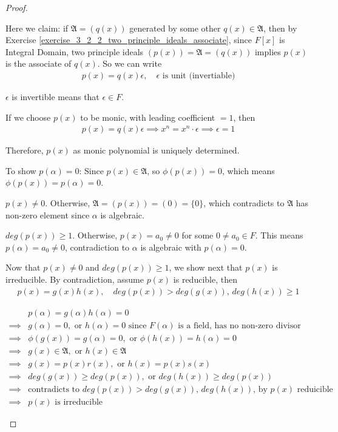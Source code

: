 \documentclass[utf8]{ctexbook}
\begin{document}
\begin{proof}
\begin{enumerate}
{Here we claim: if $\mathfrak{A} = (q(x))$ generated by some other $q(x) \in \mathfrak{A}$, then by Exercise \ref{exercise_3_2_2_two_principle_ideals_associate}, since $F[x]$ is Integral Domain, two principle ideals $(p(x)) = \mathfrak{A} = (q(x))$ implies $p(x)$ is the associate of $q(x)$. So we can write
\begin{align*}
p(x) = q(x) \epsilon, \quad \epsilon \mbox{ is unit (invertiable)}
\end{align*}

$\epsilon$ is invertible means that $\epsilon \in F$. 

If we choose $p(x)$ to be monic, with leading coefficient $=1$, then
\begin{align*}
p(x) = q(x) \epsilon \implies x^n = x^n \cdot \epsilon \implies \epsilon = 1
\end{align*}

Therefore, $p(x)$ as monic polynomial is uniquely determined.

To show $p(\alpha) = 0$: Since $p(x) \in \mathfrak{A}$, so $\phi(p(x)) = 0$, which means $\phi(p(x)) = p(\alpha) = 0$.

$p(x) \neq 0$. Otherwise, $\mathfrak{A}= (p(x)) = (0) = \{ 0\}$, which contradicts to $\mathfrak{A}$ has non-zero element since $\alpha$ is algebraic.

$deg(p(x)) \geq 1$. Otherwise, $p(x) = a_0 \neq 0$ for some $0 \neq a_0 \in F$. This means $ p(\alpha) = a_0 \neq 0$, contradiction to $\alpha$ is algebraic with $p(\alpha) =0 $.

Now that $p(x) \neq 0 $ and $deg(p(x)) \geq 1$, we show next that $p(x)$ is irreducible. By contradiction, assume $p(x)$ is reducible, then
\begin{align*}
p(x) = g(x) h(x), \quad deg(p(x)) > deg(g(x)),\, deg(h(x)) \geq 1
\end{align*}

\begin{align*}
& p(\alpha) = g(\alpha) h(\alpha) = 0 \\
\implies & g(\alpha)=0, \mbox{ or } h(\alpha) = 0 \mbox{ since $F(\alpha)$ is a field, has no non-zero divisor}\\
\implies & \phi(g(x)) = g(\alpha) =0 , \mbox{ or } \phi(h(x)) =h(\alpha) = 0 \\
\implies & g(x) \in \mathfrak{A}, \mbox{ or } h(x) \in \mathfrak{A} \\
\implies & g(x) = p(x) r(x), \mbox{ or } h(x) = p(x) s(x) \\
\implies & deg(g(x)) \geq deg(p(x)), \mbox{ or } deg(h(x)) \geq deg(p(x)) \\
\implies & \mbox{contradicts to } deg(p(x)) > deg(g(x)),\, deg(h(x)) \mbox{, by $p(x)$ reduicible} \\
\implies & p(x) \mbox{ is irreducible}
\end{align*}

}
\end{enumerate}
\end{proof}
\end{document}
